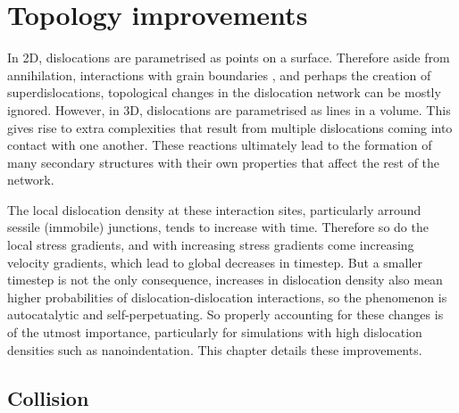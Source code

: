 \chapter{Topology improvements}
\label{c:topology}

In 2D, dislocations are parametrised as points on a surface. Therefore aside from annihilation, interactions with grain boundaries \cite{grain_size_eff1, grain_size_eff2}, and perhaps the creation of superdislocations, topological changes in the dislocation network can be mostly ignored. However, in 3D, dislocations are parametrised as lines in a volume. This gives rise to extra complexities that result from multiple dislocations coming into contact with one another. These reactions ultimately lead to the formation of many secondary structures with their own properties that affect the rest of the network.

The local dislocation density at these interaction sites, particularly arround sessile (immobile) junctions, tends to increase with time. Therefore so do the local stress gradients, and with increasing stress gradients come increasing velocity gradients, which lead to global decreases in timestep. But a smaller timestep is not the only consequence, increases in dislocation density also mean higher probabilities of dislocation-dislocation interactions, so the phenomenon is autocatalytic and self-perpetuating. So properly accounting for these changes is of the utmost importance, particularly for simulations with high dislocation densities such as nanoindentation. This chapter details these improvements.

\section{Collision}\label{s:collision}

